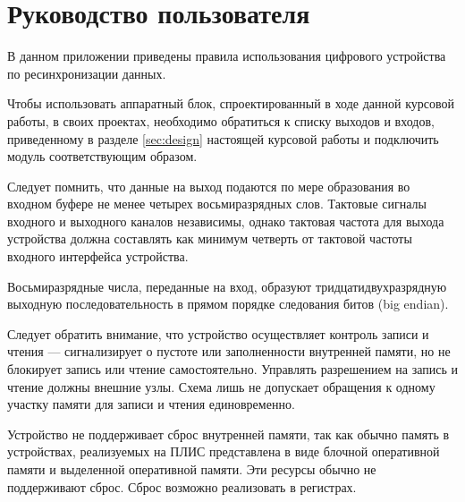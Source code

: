 \chapter{Руководство пользователя}
\label{cha:appendix3}
\setlength{\parindent}{12.5mm}

В данном приложении приведены правила использования цифрового устройства по ресинхронизации данных. 

Чтобы использовать аппаратный блок, спроектированный в ходе данной курсовой работы, в своих проектах, необходимо обратиться к списку выходов и входов, приведенному в разделе \ref{sec:design} настоящей курсовой работы и подключить модуль соответствующим образом.

Следует помнить, что данные на выход подаются по мере образования во входном буфере не менее четырех восьмиразрядных слов. Тактовые сигналы входного и выходного каналов независимы, однако тактовая частота для выхода устройства должна составлять как минимум  четверть от тактовой частоты входного интерфейса устройства.

Восьмиразрядные числа, переданные на вход, образуют тридцатидвухразрядную выходную последовательность в прямом порядке следования битов (big endian). 

Следует обратить внимание, что устройство осуществляет контроль записи и чтения --- сигнализирует о пустоте или заполненности внутренней памяти, но не блокирует запись или чтение самостоятельно. Управлять разрешением на запись и чтение должны внешние узлы. Схема лишь не допускает обращения к одному участку памяти для записи и чтения единовременно.

Устройство не поддерживает сброс внутренней памяти, так как обычно память в устройствах, реализуемых на ПЛИС представлена в виде блочной оперативной памяти и выделенной оперативной памяти. Эти ресурсы обычно не поддерживают сброс. Сброс возможно реализовать в регистрах. 


